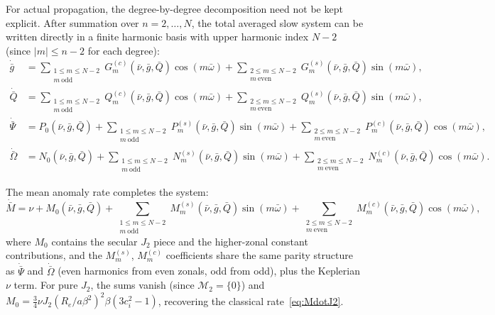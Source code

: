 \documentclass[11pt]{article}
\begin{document}
For actual propagation, the degree-by-degree decomposition need not be kept
explicit. After summation over $n=2,\dots,N$, the total averaged slow system
can be written directly in a finite harmonic basis with upper harmonic index
$N-2$ (since $|m| \le n-2$ for each degree):
\begin{align}
\dot{\bar g}
&=
\sum_{\substack{1\le m\le N-2\\ m\ \mathrm{odd}}}
G^{(c)}_m(\bar\nu,\bar g,\bar Q)\cos(m\bar\omega)
+
\sum_{\substack{2\le m\le N-2\\ m\ \mathrm{even}}}
G^{(s)}_m(\bar\nu,\bar g,\bar Q)\sin(m\bar\omega),
\label{eq:gdot_total_N}\\
\dot{\bar Q}
&=
\sum_{\substack{1\le m\le N-2\\ m\ \mathrm{odd}}}
Q^{(c)}_m(\bar\nu,\bar g,\bar Q)\cos(m\bar\omega)
+
\sum_{\substack{2\le m\le N-2\\ m\ \mathrm{even}}}
Q^{(s)}_m(\bar\nu,\bar g,\bar Q)\sin(m\bar\omega),
\label{eq:Qdot_total_N}\\
\dot{\bar\Psi}
&=
P_0(\bar\nu,\bar g,\bar Q)
+
\sum_{\substack{1\le m\le N-2\\ m\ \mathrm{odd}}}
P^{(s)}_m(\bar\nu,\bar g,\bar Q)\sin(m\bar\omega)
+
\sum_{\substack{2\le m\le N-2\\ m\ \mathrm{even}}}
P^{(c)}_m(\bar\nu,\bar g,\bar Q)\cos(m\bar\omega),
\label{eq:Psidot_total_N}\\
\dot{\bar\Omega}
&=
N_0(\bar\nu,\bar g,\bar Q)
+
\sum_{\substack{1\le m\le N-2\\ m\ \mathrm{odd}}}
N^{(s)}_m(\bar\nu,\bar g,\bar Q)\sin(m\bar\omega)
+
\sum_{\substack{2\le m\le N-2\\ m\ \mathrm{even}}}
N^{(c)}_m(\bar\nu,\bar g,\bar Q)\cos(m\bar\omega).
\label{eq:Omegadot_total_N}
\end{align}

The mean anomaly rate completes the system:
\begin{equation}
\dot{\bar M}
=
\nu
+ M_0(\bar\nu,\bar g,\bar Q)
+
\sum_{\substack{1\le m\le N-2\\ m\ \mathrm{odd}}}
M^{(s)}_m(\bar\nu,\bar g,\bar Q)\sin(m\bar\omega)
+
\sum_{\substack{2\le m\le N-2\\ m\ \mathrm{even}}}
M^{(c)}_m(\bar\nu,\bar g,\bar Q)\cos(m\bar\omega),
\label{eq:Mdot_total_N}
\end{equation}
where $M_0$ contains the secular $J_2$ piece and the higher-zonal constant
contributions, and the $M^{(s)}_m$, $M^{(c)}_m$ coefficients share the same
parity structure as $\dot{\bar\Psi}$ and $\dot{\bar\Omega}$ (even harmonics
from even zonals, odd from odd), plus the Keplerian $\nu$ term. For pure $J_2$, the sums vanish (since $\mathcal M_2 = \{0\}$) and
$M_0 = \frac{3}{4}\nu J_2 (R_e/a\beta^2)^2 \beta(3c_i^2-1)$, recovering
the classical rate~\eqref{eq:MdotJ2}.
\end{document}
